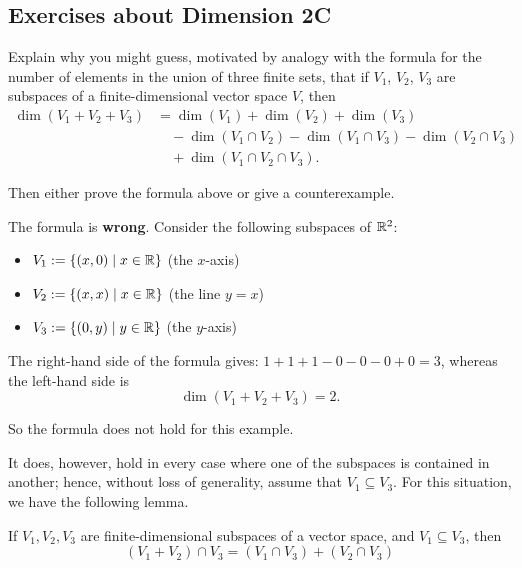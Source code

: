 \subsection*{Exercises about Dimension 2C}

\setcounter{xrcscount}{19}
\begin{xrcs}
  Explain why you might guess, motivated by analogy with the formula for the number of elements in the union of three finite sets, that if $V_1$, $V_2$, $V_3$ are subspaces of a finite-dimensional vector space $V$, then
  \begin{equation}
      \begin{aligned}
      \dim (V_1 + V_2 + V_3) &= \dim (V_1) + \dim (V_2) + \dim (V_3) \\
      & \quad - \dim(V_1 \cap V_2) - \dim (V_1 \cap V_3) - \dim (V_2 \cap V_3) \\
      & \quad + \dim (V_1 \cap V_2 \cap V_3).
    \end{aligned}
  \end{equation}


  Then either prove the formula above or give a counterexample.


  The formula is \textbf{wrong}. Consider the following subspaces of $\mathbb{R}^2$:
  \begin{itemize}
    \item $V_1 := \{ (x,0) \mid x \in \mathbb{R} \} $ (the $x$-axis) \\
    \item $V_2 := \{ (x,x) \mid x \in \mathbb{R} \} $ (the line $y=x$)
    \item $V_3 := \{ (0,y) \mid y \in \mathbb{R} \} $ (the $y$-axis)
  \end{itemize}

  The right-hand side of the formula gives: $1+1+1-0-0-0+0 = 3$, whereas the left-hand side is
  \begin{equation}
    \dim (V_1 + V_2 + V_3) = 2.
  \end{equation}

  So the formula does not hold for this example.

  It does, however, hold in every case where one of the subspaces is contained in another; hence, without loss of generality, assume that $V_1 \subseteq V_3$. For this situation, we have the following lemma.

   If $V_1, V_2, V_3$ are finite-dimensional subspaces of a vector space, and $V_1 \subseteq V_3$, then
  \begin{equation}
    \label{eq: lemma}
     (V_1 + V_2) \cap V_3 = (V_1 \cap V_3) + (V_2 \cap V_3)
  \end{equation}


\end{xrcs}
